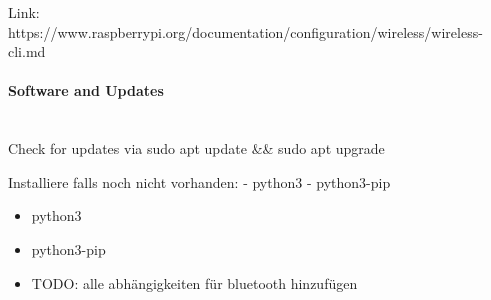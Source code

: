 Link: https://www.raspberrypi.org/documentation/configuration/wireless/wireless-cli.md

\paragraph{Software and Updates} \hspace{0pt} \\
Check for updates via sudo apt update \&\& sudo apt upgrade

Installiere falls noch nicht vorhanden:
- python3
- python3-pip 
\begin{itemize}
  \item python3
  \item python3-pip
  \item TODO: alle abhängigkeiten für bluetooth hinzufügen
\end{itemize}

